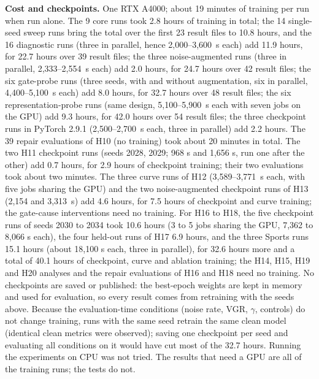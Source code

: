\documentclass[conference]{IEEEtran}
\begin{document}
\textbf{Cost and checkpoints.} One RTX A4000; about 19 minutes of training per run when run alone. The 9 core runs took 2.8 hours of training in total; the 14 single-seed sweep runs bring the total over the first 23 result files to 10.8 hours, and the 16 diagnostic runs (three in parallel, hence 2,000--3,600~s each) add 11.9 hours, for 22.7 hours over 39 result files; the three noise-augmented runs (three in parallel, 2,333--2,554~s each) add 2.0 hours, for 24.7 hours over 42 result files; the six gate-probe runs (three seeds, with and without augmentation, six in parallel, 4,400--5,100~s each) add 8.0 hours, for 32.7 hours over 48 result files; the six representation-probe runs (same design, 5,100--5,900~s each with seven jobs on the GPU) add 9.3 hours, for 42.0 hours over 54 result files; the three checkpoint runs in PyTorch 2.9.1 (2,500--2,700~s each, three in parallel) add 2.2 hours. The 39 repair evaluations of H10 (no training) took about 20 minutes in total. The two H11 checkpoint runs (seeds 2028, 2029; 968 s and 1,656 s, run one after the other) add 0.7 hours, for 2.9 hours of checkpoint training; their two evaluations took about two minutes. The three curve runs of H12 (3,589--3,771~s each, with five jobs sharing the GPU) and the two noise-augmented checkpoint runs of H13 (2,154 and 3,313~s) add 4.6 hours, for 7.5 hours of checkpoint and curve training; the gate-cause interventions need no training. For H16 to H18, the five checkpoint runs of seeds 2030 to 2034 took 10.6 hours (3 to 5 jobs sharing the GPU, 7,362 to 8,066 s each), the four held-out runs of H17 6.9 hours, and the three Sports runs 15.1 hours (about 18,100 s each, three in parallel), for 32.6 hours more and a total of 40.1 hours of checkpoint, curve and ablation training; the H14, H15, H19 and H20 analyses and the repair evaluations of H16 and H18 need no training. No checkpoints are saved or published: the best-epoch weights are kept in memory and used for evaluation, so every result comes from retraining with the seeds above. Because the evaluation-time conditions (noise rate, VGR, $\gamma$, controls) do not change training, runs with the same seed retrain the same clean model (identical clean metrics were observed); saving one checkpoint per seed and evaluating all conditions on it would have cut most of the 32.7 hours. Running the experiments on CPU was not tried. The results that need a GPU are all of the training runs; the tests do not.
\end{document}
